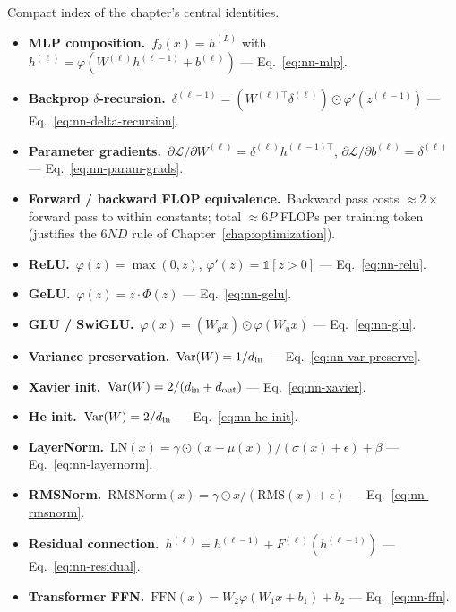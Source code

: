 \begin{derivledger}
Compact index of the chapter's central identities.
\begin{itemize}
  \item \textbf{MLP composition.}\
        $f_\theta(x) = h^{(L)}$ with
        $h^{(\ell)} = \varphi(W^{(\ell)} h^{(\ell-1)} + b^{(\ell)})$
        --- Eq.~\eqref{eq:nn-mlp}.
  \item \textbf{Backprop $\delta$-recursion.}\
        $\delta^{(\ell-1)} = (W^{(\ell)\top} \delta^{(\ell)}) \odot \varphi'(z^{(\ell-1)})$
        --- Eq.~\eqref{eq:nn-delta-recursion}.
  \item \textbf{Parameter gradients.}\
        $\partial \mathcal{L} / \partial W^{(\ell)} = \delta^{(\ell)} h^{(\ell-1)\top}$,
        $\partial \mathcal{L} / \partial b^{(\ell)} = \delta^{(\ell)}$
        --- Eq.~\eqref{eq:nn-param-grads}.
  \item \textbf{Forward / backward FLOP equivalence.}\
        Backward pass costs $\approx 2\times$ forward pass to
        within constants; total $\approx 6P$ FLOPs per training
        token (justifies the $6ND$ rule of Chapter~\ref{chap:optimization}).
  \item \textbf{ReLU.}\
        $\varphi(z) = \max(0, z)$, $\varphi'(z) = \mathbb{1}[z>0]$
        --- Eq.~\eqref{eq:nn-relu}.
  \item \textbf{GeLU.}\
        $\varphi(z) = z \cdot \Phi(z)$ --- Eq.~\eqref{eq:nn-gelu}.
  \item \textbf{GLU / SwiGLU.}\
        $\varphi(x) = (W_g x) \odot \varphi(W_u x)$
        --- Eq.~\eqref{eq:nn-glu}.
  \item \textbf{Variance preservation.}\
        $\mathrm{Var}(W) = 1/d_{\rm in}$
        --- Eq.~\eqref{eq:nn-var-preserve}.
  \item \textbf{Xavier init.}\
        $\mathrm{Var}(W) = 2/(d_{\rm in} + d_{\rm out})$
        --- Eq.~\eqref{eq:nn-xavier}.
  \item \textbf{He init.}\
        $\mathrm{Var}(W) = 2/d_{\rm in}$
        --- Eq.~\eqref{eq:nn-he-init}.
  \item \textbf{LayerNorm.}\
        $\mathrm{LN}(x) = \gamma \odot (x - \mu(x))/(\sigma(x) + \epsilon) + \beta$
        --- Eq.~\eqref{eq:nn-layernorm}.
  \item \textbf{RMSNorm.}\
        $\mathrm{RMSNorm}(x) = \gamma \odot x / (\mathrm{RMS}(x) + \epsilon)$
        --- Eq.~\eqref{eq:nn-rmsnorm}.
  \item \textbf{Residual connection.}\
        $h^{(\ell)} = h^{(\ell-1)} + F^{(\ell)}(h^{(\ell-1)})$
        --- Eq.~\eqref{eq:nn-residual}.
  \item \textbf{Transformer FFN.}\
        $\mathrm{FFN}(x) = W_2 \varphi(W_1 x + b_1) + b_2$
        --- Eq.~\eqref{eq:nn-ffn}.
\end{itemize}
\end{derivledger}

